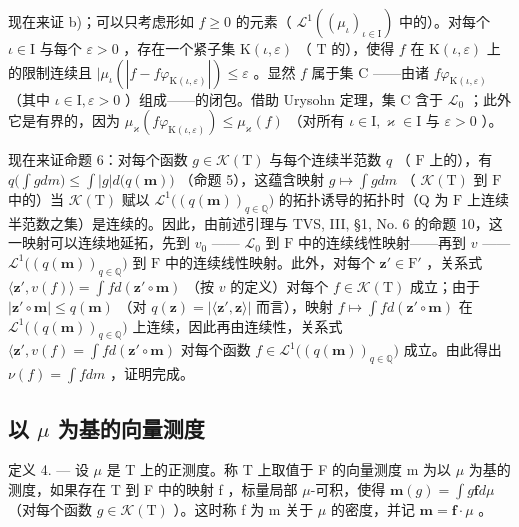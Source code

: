 现在来证 b)；可以只考虑形如 \(f \geqslant 0\) 的元素（ \(\mathcal{L}^1((\mu_\iota)_{\iota \in \mathrm{I}})\) 中的）。对每个 \(\iota \in \mathrm{I}\) 与每个 \(\varepsilon > 0\) ，存在一个紧子集 \(\mathrm{K}(\iota, \varepsilon)\) （ \(\mathrm{T}\) 的），使得 \(f\) 在 \(\mathrm{K}(\iota, \varepsilon)\) 上的限制连续且 \(|\mu_\iota(|f - f\varphi_{\mathrm{K}(\iota, \varepsilon)}|) \leqslant \varepsilon\) 。显然 \(f\) 属于集 \(\mathrm{C}\) ——由诸 \(f\varphi_{\mathrm{K}(\iota, \varepsilon)}\) （其中 \(\iota \in \mathrm{I}, \varepsilon > 0\) ）组成——的闭包。借助 Urysohn 定理，集 \(\mathrm{C}\) 含于 \(\mathcal{L}_0\) ；此外它是有界的，因为 \(\mu_\varkappa(f\varphi_{\mathrm{K}(\iota, \varepsilon)}) \leqslant \mu_\varkappa(f)\) （对所有 \(\iota \in \mathrm{I}, \varkappa \in \mathrm{I}\) 与 \(\varepsilon > 0\) ）。

现在来证命题 6：对每个函数 \(g \in \mathcal{K}(\mathrm{T})\) 与每个连续半范数 \(q\) （ \(\mathrm{F}\) 上的），有 \(q\big(\int g dm\big) \leqslant \int |g| d\big(q(\mathbf{m})\big)\) （命题 5），这蕴含映射 \(g \mapsto \int g dm\) （ \(\mathcal{K}(\mathrm{T})\) 到 \(\mathrm{F}\) 中的）当 \(\mathcal{K}(\mathrm{T})\) 赋以 \(\mathcal{L}^1\big((q(\mathbf{m}))_{q \in \mathbb{Q}}\big)\) 的拓扑诱导的拓扑时（Q 为 \(\mathrm{F}\) 上连续半范数之集）是连续的。因此，由前述引理与 TVS, III, §1, No. 6 的命题 10，这一映射可以连续地延拓，先到 \(v_0\) —— \(\mathcal{L}_0\) 到 \(\mathrm{F}\) 中的连续线性映射——再到 \(v\) —— \(\mathcal{L}^1\big((q(\mathbf{m}))_{q \in \mathbb{Q}}\big)\) 到 \(\mathrm{F}\) 中的连续线性映射。此外，对每个 \(\mathbf{z}' \in \mathrm{F}'\) ，关系式 \(\langle \mathbf{z}', v(f) \rangle = \int f d(\mathbf{z}' \circ \mathbf{m})\) （按 \(v\) 的定义）对每个 \(f \in \mathcal{K}(\mathrm{T})\) 成立；由于 \(|\mathbf{z}' \circ \mathbf{m}| \leqslant q(\mathbf{m})\) （对 \(q(\mathbf{z}) = |\langle \mathbf{z}', \mathbf{z} \rangle|\) 而言），映射 \(f \mapsto \int f d(\mathbf{z}' \circ \mathbf{m})\) 在 \(\mathcal{L}^1\big((q(\mathbf{m}))_{q \in \mathbb{Q}}\big)\) 上连续，因此再由连续性，关系式 \(\langle \mathbf{z}', v(f) = \int f d(\mathbf{z}' \circ \mathbf{m})\) 对每个函数 \(f \in \mathcal{L}^1\big((q(\mathbf{m}))_{q \in \mathbb{Q}}\big)\) 成立。由此得出 \(\nu(f) = \int f dm\) ，证明完成。

\subsection{\texorpdfstring{以 \(\mu\) 为基的向量测度}{以 mu 为基的向量测度}}

定义 4. --- 设 \(\mu\) 是 T 上的正测度。称 T 上取值于 F 的向量测度 m 为以 \(\mu\) 为基的测度，如果存在 T 到 F 中的映射 f ，标量局部 \(\mu\)-可积，使得 \(\mathbf{m}(g) = \int g\mathbf{f}d\mu\) （对每个函数 \(g \in \mathcal{K}(\mathrm{T})\) ）。这时称 f 为 m 关于 \(\mu\) 的密度，并记 \(\mathbf{m} = \mathbf{f} \cdot \mu\) 。

